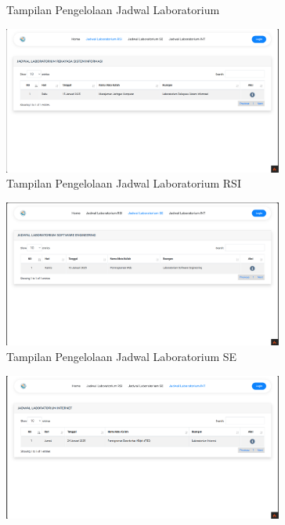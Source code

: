 \begin{enumerate}
\begin{figure}
		      \caption{Tampilan Pengelolaan Jadwal Laboratorium}
		      \label{fig:jadwal}
	      \end{figure}
	      \begin{figure}
		      \centering
		      \includegraphics[width=0.82\textwidth]{konten/gambar/hasil/labor-rsi.png}
		      \caption{Tampilan Pengelolaan Jadwal Laboratorium RSI}
		      \label{fig:jadwal-rsi}
	      \end{figure}
	      \begin{figure}
		      \centering
		      \includegraphics[width=0.82\textwidth]{konten/gambar/hasil/labor-se.png}
		      \caption{Tampilan Pengelolaan Jadwal Laboratorium SE}
		      \label{fig:jadwal-se}
	      \end{figure}
	      \begin{figure}
		      \centering
		      \includegraphics[width=0.82\textwidth]{konten/gambar/hasil/labor-int.png}

\end{figure}
\end{enumerate}
